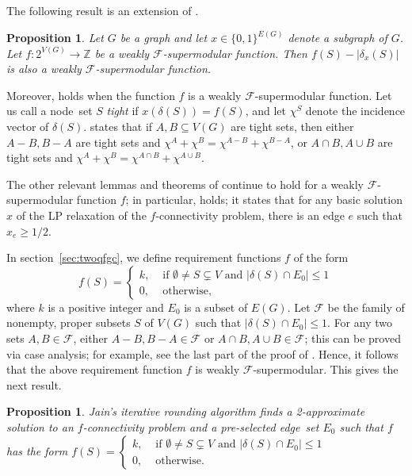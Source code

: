 \documentclass[11pt]{article}
\newtheorem{proposition}[theorem]{Proposition}
\newcommand{\Zint}{\ensuremath{\mathbb Z}}
\newcommand{\F}{\mathcal{F}}
\begin{document}
{The following result is an extension of \cite[Theorem~2.5]{Jain01}.

\begin{proposition}
Let $G$ be a graph and let $x\in\{0,1\}^{E(G)}$ denote a subgraph of $G$.
Let $f: 2^{V(G)} \rightarrow \Zint$ be a weakly $\F$-supermodular function.
Then $f(S) - |\delta_x(S)|$ is also a weakly $\F$-supermodular function.
\end{proposition}

Moreover, \cite[Lemma~4.1]{Jain01} holds when the function $f$
is a weakly $\F$-supermodular function.
Let us call a node~set $S$ \textit{tight} if $x(\delta(S)) = f(S)$,
and let $\chi^S$ denote the incidence vector of $\delta(S)$.
\cite[Lemma~4.1]{Jain01} states that if $A,B \subseteq V(G)$ are tight sets,
then either $A-B, B-A$ are tight sets and
$\chi^A + \chi^B = \chi^{A-B} + \chi^{B-A}$, or 
$A\cap{B}, A\cup{B}$ are tight sets and
$\chi^A + \chi^B = \chi^{A\cap{B}} + \chi^{A\cup{B}}$.

The other relevant lemmas and theorems of \cite{Jain01} continue
to hold for a weakly $\F$-supermodular function $f$; in particular,
\cite[Theorem~3.1]{Jain01} holds; it states that for any basic
solution $x$ of the LP relaxation of the $f$-connectivity problem,
there is an edge $e$ such that $x_e\geq{1/2}$.


In section~\ref{sec:twoqfgc}, we define requirement functions $f$ of the form
\[
f(S) = \begin{cases}
    k, &\text{ if } \emptyset\neq{S}\subsetneq{V} \text{ and } |\delta(S)\cap E_0| \leq 1 \\ 0, &\text{ otherwise},
\end{cases}
\]
where $k$ is a positive integer and $E_0$ is a subset of $E(G)$.
Let $\F$ be the family of nonempty, proper subsets $S$ of $V(G)$
such that $|\delta(S)\cap{E_0}| \leq1$.
For any two sets $A,B\in\F$, either $A-B,B-A\in\F$ or $A\cap{B},A\cup{B}\in\F$;
this can be proved via case analysis;
for example, see the last part of the proof of \cite[Lemma~4.3]{BCHI23}.
Hence, it follows that the above requirement function $f$ is weakly $\F$-supermodular.
This gives the next result.

\begin{proposition} \label{prop:wFsupmod}
Jain's iterative rounding algorithm finds a 2-approximate solution
to an $f$-connectivity problem and a pre-selected edge~set $E_0$
such that $f$ has the form
$\displaystyle f(S) = \begin{cases}
    k, &\text{ if } \emptyset\neq{S}\subsetneq{V} \text{ and } |\delta(S)\cap E_0| \leq 1 \\ 0, &\text{ otherwise}.
\end{cases}
$
\end{proposition}
}
\end{document}
